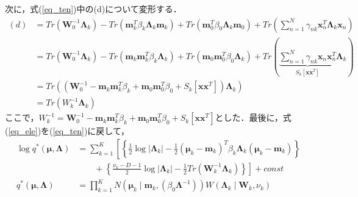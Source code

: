 \documentclass[uplatex]{jsarticle}
\begin{document}
次に，式(\ref{eq_ten})中の(d)について変形する．
\begin{align}
\label{eq_ele}
(d) &= Tr(\bm{W}_0^{-1}\bm{\Lambda}_k) - Tr(\bm{m}_k^T\beta_k\bm{\Lambda}_k\bm{m}_k) + Tr(\bm{m}_0^T\beta_0\bm{\Lambda}_k\bm{m}_0) + Tr(\sum_{n=1}^N \gamma_{nk}\bm{x}_n^T\bm{\Lambda}_k\bm{x}_n) \nonumber \\
    &= Tr(\bm{W}_0^{-1}\bm{\Lambda}_k) - Tr(\bm{m}_k\bm{m}_k^T\beta_k\bm{\Lambda}_k) + Tr(\bm{m}_0\bm{m}_0^T\beta_0\bm{\Lambda}_k) + Tr(\underbrace{\sum_{n=1}^N \gamma_{nk}\bm{x}_n\bm{x}_n^T}_{S_k[\bm{x}\bm{x}^T]}\bm{\Lambda}_k) \nonumber \\
    &= Tr((\bm{W}_0^{-1} - \bm{m}_k\bm{m}_k^T\beta_k + \bm{m}_0\bm{m}_0^T\beta_0 + S_k[\bm{x}\bm{x}^T])\bm{\Lambda}_k) \nonumber \\
    &= Tr(W_k^{-1}\bm{\Lambda}_k)
\end{align}
ここで，$W_k^{-1} = \bm{W}_0^{-1} - \bm{m}_k\bm{m}_k^T\beta_k + \bm{m}_0\bm{m}_0^T\beta_0 + S_k[\bm{x}\bm{x}^T]$とした．最後に，式(\ref{eq_ele})を(\ref{eq_ten})に戻して，
\begin{align}
\log q^* (\bm{\mu}, \bm{\Lambda}) &= \sum_{k=1}^K \left[ \left\{ \frac{1}{2}\log|\bm{\Lambda}_k| - \frac{1}{2}(\bm{\mu}_k-\bm{m}_k)^T\beta_k\bm{\Lambda}_k(\bm{\mu}_k-\bm{m}_k) \right\} \right. \nonumber \\
 &\qquad+ \left. \left\{ \frac{\nu_k - D - 1}{2}\log|\bm{\Lambda}_k| - \frac{1}{2} Tr(\bm{W}_k^{-1}\bm{\Lambda}_k) \right\} \right] + const \nonumber \\
 q^*(\bm{\mu}, \bm{\Lambda}) &= \prod_{k=1}^K N(\bm{\mu}_k \mid \bm{m}_k, (\beta_0\bm{\Lambda}^{-1}))W(\bm{\Lambda}_k \mid \bm{W}_k, \nu_k)
\end{align}
\end{document}
